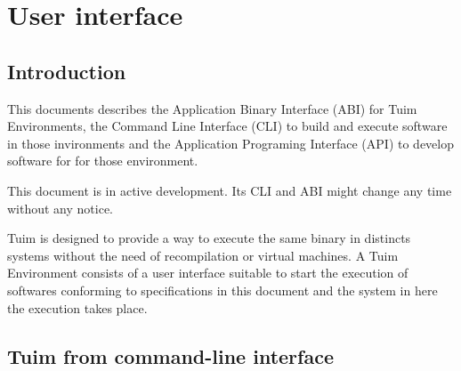 \documentclass[
   12pt,                         %
   openright,                    %
   twoside,                      %
   a4paper,                      %
   sumario = tradicional,        %
   english,                      %
   xcolor=table                  %
]{abntex2}
\begin{document}
\imprimircapa

\newpage
\tableofcontents
\newpage
\textual

\part{User interface}
\chapter{Introduction}

This documents describes the Application Binary Interface (ABI)
for Tuim Environments\cite{tuim},
the Command Line Interface (CLI)
to build and execute software in those invironments
and the Application Programing Interface (API)
to develop software for for those environment.

This document is in active development.
Its CLI and ABI might change any time without any notice.

Tuim is designed to provide a way to execute the same binary in distincts systems
without the need of recompilation or virtual machines.
A Tuim Environment consists of a user interface suitable to start the execution
of softwares conforming to specifications in this document
and the system in here the execution takes place.

\chapter{Tuim from command-line interface}
\end{document}
